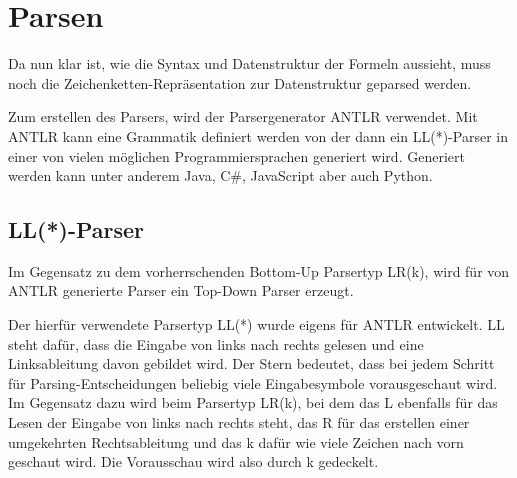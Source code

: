\section{Parsen}
Da nun klar ist, wie die Syntax und Datenstruktur der Formeln aussieht, muss noch die Zeichenketten-Repräsentation zur Datenstruktur geparsed werden.

Zum erstellen des Parsers, wird der Parsergenerator ANTLR verwendet. Mit ANTLR kann eine Grammatik definiert werden von der dann ein LL(*)-Parser in einer von vielen möglichen Programmiersprachen generiert wird. Generiert werden kann unter anderem Java, C\#, JavaScript aber auch Python. \cite{antlr_doc}

\subsection{LL(*)-Parser}
Im Gegensatz zu dem vorherrschenden Bottom-Up Parsertyp LR(k), wird für von ANTLR generierte Parser ein Top-Down Parser erzeugt. \cite{compiler_dragon_book}\cite{ll_star_parser}

Der hierfür verwendete Parsertyp LL(*) wurde eigens für ANTLR entwickelt. LL steht dafür, dass die Eingabe von links nach rechts gelesen und eine Linksableitung davon gebildet wird. Der Stern bedeutet, dass bei jedem Schritt für Parsing-Entscheidungen beliebig viele Eingabesymbole vorausgeschaut wird. \cite{ll_star_parser} Im Gegensatz dazu wird beim Parsertyp LR(k), bei dem das L ebenfalls für das Lesen der Eingabe von links nach rechts steht, das R für das erstellen einer umgekehrten Rechtsableitung und das k dafür wie viele Zeichen nach vorn geschaut wird. Die Vorausschau wird also durch k gedeckelt. \cite{compiler_dragon_book}

